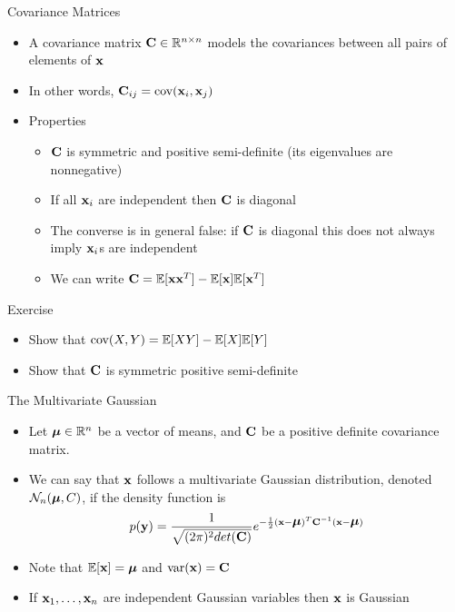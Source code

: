 \documentclass{beamer}
\begin{document}
\begin{frame}{Covariance Matrices} 
\begin{itemize} 
 \item A covariance matrix $\textbf{C} \in \mathbb{R}^{n \times n}$ models the covariances between all pairs of elements of $\textbf{x}$
 \item In other words, $\textbf{C}_{ij} = \mbox{cov}(\textbf{x}_i, \textbf{x}_j)$
 \item Properties 
 \begin{itemize}
 \item $\textbf{C}$ is symmetric and positive semi-definite (its eigenvalues are nonnegative) 
 \item If all $\textbf{x}_i$ are independent then $\textbf{C}$ is diagonal 
 \item The converse is in general false: if $\textbf{C}$ is diagonal this does not always imply $\textbf{x}_i$s are independent 
 \item We can write $\textbf{C} = \mathbb{E}[\textbf{x}\textbf{x}^T] - \mathbb{E}[\textbf{x}]\mathbb{E}[\textbf{x}^T]$
 \end{itemize} 
\end{itemize}
\end{frame}

\begin{frame}{Exercise}  
\begin{itemize} 
 \item Show that $\mbox{cov}(X, Y) = \mathbb{E}[XY] - \mathbb{E}[X]\mathbb{E}[Y]$
 \item Show that $\textbf{C}$ is symmetric positive semi-definite 
\end{itemize} 
\end{frame}

\begin{frame}{The Multivariate Gaussian}  
\begin{itemize} 
 \item Let $\mbox{\boldmath$\mu$} \in \mathbb{R}^n$ be a vector of means, and $\textbf{C}$ be a positive definite covariance matrix. 
 \item We can say that $\textbf{x}$ follows a multivariate Gaussian distribution, denoted $\mathcal{N}_n(\mbox{\boldmath$\mu$}, C)$, if the density function is 
 \begin{displaymath} 
  p(\textbf{y}) = \frac{1}{\sqrt{(2\pi)^2 det(\textbf{C})}} e^{-\frac{1}{2}(\textbf{x} - \mbox{\boldmath$\mu$})^T\textbf{C}^{-1}(\textbf{x} - \mbox{\boldmath$\mu$})}  
 \end{displaymath}
 \item Note that $\mathbb{E}[\textbf{x}] = \mbox{\boldmath$\mu$}$ and $\mbox{var}(\textbf{x}) = \textbf{C}$  
 \item If $\textbf{x}_1, \ldots, \textbf{x}_n$ are independent Gaussian variables then $\textbf{x}$ is Gaussian 
\end{itemize}
\end{frame}
\end{document}
